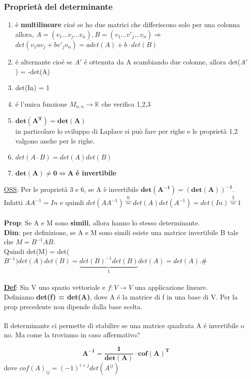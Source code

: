 \documentclass[12pt]{article}
\begin{document}
\subsubsection{Proprietà del determinante}
\begin{enumerate}
    \item é \textbf{multilineare} cioé se ho due matrici che differiscono solo per una colonna allora,
    $A = (v_1...v_j...v_n), B = (v_1...v'_j...v_n) \Rightarrow$  $det(v_1av_j+bv'_jv_n) = a\dot det(A)+b \cdot det(B)$
    \item é alternante cioé se $A'$ é ottenuta da A scambiando due colonne, allora det($A'$) = -det(A)
    \item det(In) = 1
    \item é l'unica funzione $M_{n,n} \longrightarrow \mathbb{K}$ che verifica 1,2,3
    \item $\boldsymbol{det(A^T) = det(A)}$\\
    in particolare lo sviluppo di Laplace si può fare per righe e le proprietà 1,2 valgono anche per le righe.
    \item $det(A\cdot B) = det(A)det(B)$
    \item $\boldsymbol{det(A) \neq 0 \iff A}$ \textbf{é invertibile}
\end{enumerate}
\underline{OSS}: Per le proprietà 3 e 6, se A è invertibile $\boldsymbol{det(A^{-1}) = (det(A))^{-1}}$.\\
Infatti $AA^{-1} = In$ e quindi $det(AA^{-1}) \overbrace{=}^{6} det(A)det(A^{-1}) = det(In) \overbrace{=}^{3}1 $\\\\
\textbf{Prop}: Se A e M sono \textbf{simili}, allora hanno lo stesso determinante.\\
\textbf{Dim}: per definizione, se A e M sono simili esiste una matrice invertibile B tale che $M = B^{-1}AB$.\\
Quindi det(M) = det($B^{-1})det(A)det(B) = \underbrace{det(B)^{-1}det(B)}_{1}det(A) = det(A)$.\#\\\\
\underline{\textbf{Def}}: Sia V uno spazio vettoriale e $f:V\longrightarrow V$ una applicazione lineare.\\
Definiamo \textbf{det(f) = det(A)}, dove A é la matrice di f in una base di V. Per la prop precedente non dipende dalla base scelta.
\\\\
Il determinante ci permette di stabilire se una matrice quadrata A é invertibile o no. Ma come la troviamo in caso affermativo?
\begin{theorem}
    $$\boldsymbol{A^{-1} = \frac{1}{det(A)}\cdot cof(A)^T}$$
    dove $cof(A)_{ij} = (-1)^{i+j}det(A^{ij})$
\end{theorem}
\end{document}
